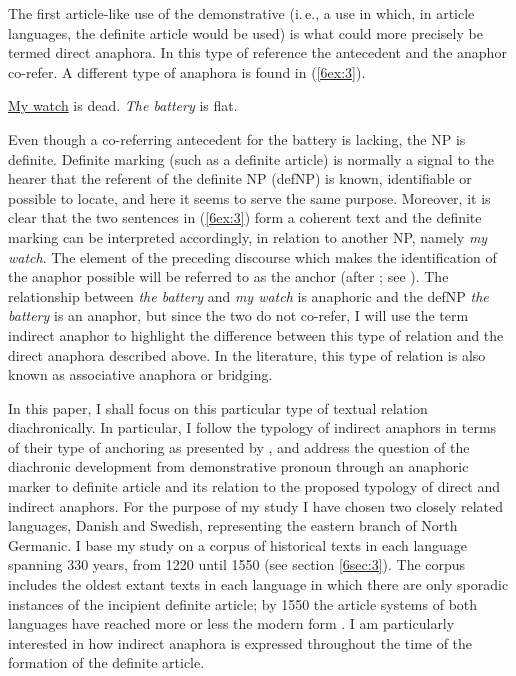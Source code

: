 \documentclass[output=paper]{langsci/langscibook}
\begin{document}
The first article-like use of the demonstrative (i.\,e., a use in which, in article languages, the definite article would be used) is what could more precisely be termed direct anaphora. In this type of reference the antecedent and the anaphor co-refer. A different type of anaphora is found in (\ref{6ex:3}).

\begin{exe}
\ex\label{6ex:3}
{\ul{My watch}} is dead. {\emph{The battery}} is flat. \citep[after][]{schwarz:00}
\end{exe}

Even though a co-referring antecedent for the battery is lacking, the NP is definite. Definite marking (such as a definite article) is normally a signal to the hearer that the referent of the definite NP (defNP) is known, identifiable or possible to locate, and here it seems to serve the same purpose. Moreover, it is clear that the two sentences in (\ref{6ex:3}) form a coherent text and the definite marking can be interpreted accordingly, in relation to another NP, namely {\emph{my watch}}. The element of the preceding discourse which makes the identification of the anaphor possible will be referred to as the anchor (after \citealt{fraurud:90}; see ). The relationship between {\emph{the battery}} and {\emph{my watch}} is anaphoric and the defNP {\emph{the battery}} is an anaphor, but since the two do not co-refer, I will use the term indirect anaphor to highlight the difference between this type of relation and the direct anaphora described above. In the literature, this type of relation is also known as associative anaphora or bridging.

\largerpage[-1]
In this paper, I shall focus on this particular type of textual relation diachronically. In particular, I follow the typology of indirect anaphors in terms of their type of anchoring as presented by \cite{schwarz:00}, and address the question of the diachronic development from demonstrative pronoun through an anaphoric marker to definite article and its relation to the proposed typology of direct and indirect anaphors. For the purpose of my study I have chosen two closely related languages, Danish and Swedish, representing the eastern branch of North Germanic. I base my study on a corpus of historical texts in each language spanning 330 years, from 1220 until 1550 (see section  \ref{6sec:3}). The corpus includes the oldest extant texts in each language in which there are only sporadic instances of the incipient definite article; by 1550 the article systems of both languages have reached more or less the modern form \citep{strohwollin:16,skaftejensen:07}. I am particularly interested in how indirect anaphora is expressed throughout the time of the formation of the definite article. 
\end{document}
